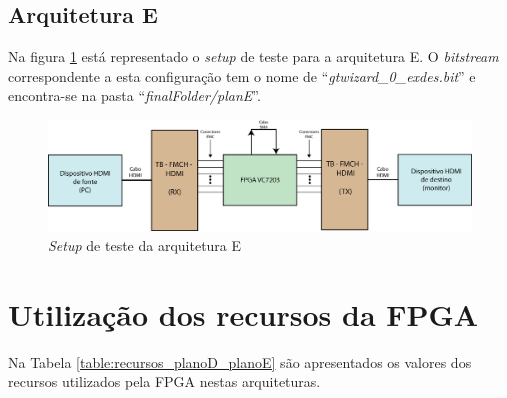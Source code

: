 \documentclass[11pt,a4paper]{article}
\begin{document}
	\subsection{Arquitetura E}
		Na figura \ref{fig:setupE} está representado o \textit{setup} de teste para a arquitetura E. O \textit{bitstream} correspondente a esta configuração tem o nome de ``\textit{gtwizard\_0\_exdes.bit}'' e encontra-se na pasta ``\textit{finalFolder/planE}''.
		
		\begin{figure}[h!]
		\begin{center}
			\includegraphics[width=1.0\textwidth]{planEsch} 
			\caption{\textit{Setup} de teste da arquitetura E}
			\label{fig:setupE}
		\end{center}
	\end{figure}



	\section{Utilização dos recursos da FPGA}
	
	Na Tabela \ref{table:recursos_planoD_planoE} são apresentados os valores dos recursos utilizados pela FPGA nestas arquiteturas.
\end{document}
